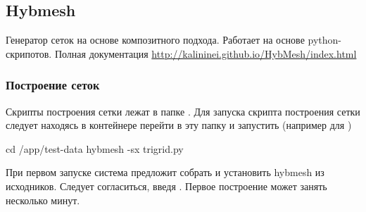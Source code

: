 \subsection{Hybmesh}
\label{sec:hybmesh}

Генератор сеток на основе композитного подхода.
Работает на основе python-скрипотов.
Полная документация \url{http://kalininei.github.io/HybMesh/index.html}

\subsubsection{Построение сеток}
Скрипты построения сетки лежат в папке .
Для запуска скрипта построения сетки следует находясь в контейнере перейти в эту папку
и запустить (например для )
\begin{shelloutput}
cd /app/test-data
hybmesh -sx trigrid.py
\end{shelloutput}

При первом запуске система предложит собрать и установить hybmesh из исходников.
Следует согласиться, введя . Первое построение может занять несколько минут.
